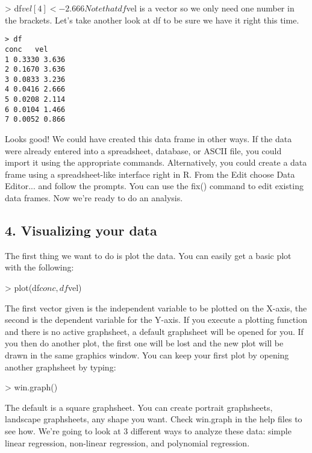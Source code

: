 \documentclass[a4paper,12pt]{article}
\begin{document}
> df$vel[4] <- 2.666
Note that df$vel is a vector so we only need one number in the brackets. Let's take another look at df to be sure we have it right this time. 
\begin{framed}
\begin{verbatim}
> df
conc   vel 
1 0.3330 3.636
2 0.1670 3.636
3 0.0833 3.236
4 0.0416 2.666
5 0.0208 2.114
6 0.0104 1.466
7 0.0052 0.866
\end{verbatim}
\end{framed}
Looks good! We could have created this data frame in other ways. If the data were already entered into a spreadsheet, database, or ASCII file, you could import it using the appropriate commands. Alternatively, you could create a data frame using a spreadsheet-like interface right in R. From the Edit choose Data Editor... and follow the prompts. You can use the fix() command to edit existing data frames. 
Now we're ready to do an analysis.

\subsection{4. Visualizing your data}


The first thing we want to do is plot the data. You can easily get a basic plot with the following:

> plot(df$conc, df$vel)

The first vector given is the independent variable to be plotted on the X-axis, the second is the dependent variable for the Y-axis. If you execute a plotting function and there is no active graphsheet, a default graphsheet will be opened for you. If you then do another plot, the first one will be lost and the new plot will be drawn in the 
same graphics window. You can keep your first plot by opening another graphsheet by typing: 

> win.graph()

The default is a square graphsheet. You can create portrait graphsheets, landscape graphsheets, any shape you want. Check win.graph in the help files to see how. 
We're going to look at 3 different ways to analyze these data: simple linear regression, non-linear regression, and polynomial regression. 


\newpage
\end{document}
